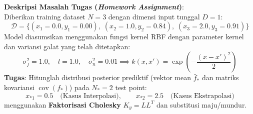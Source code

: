 \documentclass[11pt,a4paper]{article}
\def\mathbf#1{#1}%
\begin{document}
\begin{mdframed}[linewidth=1pt, linecolor=black!60, backgroundcolor=yellow!3]
\textbf{Deskripsi Masalah Tugas (\textit{Homework Assignment})}:\\
Diberikan training dataset $N = 3$ dengan dimensi input tunggal $D = 1$:
\begin{equation*}
\mathcal{D} = \big\{ (x_1 = 0.0, y_1 = 0.00), \; (x_2 = 1.0, y_2 = 0.84), \; (x_3 = 2.0, y_3 = 0.91) \big\}
\end{equation*}
Model diasumsikan menggunakan fungsi kernel RBF dengan parameter kernel dan variansi galat yang telah ditetapkan:
\begin{equation*}
\sigma_f^2 = 1.0, \quad l = 1.0, \quad \sigma_n^2 = 0.01 \implies k(x, x') = \exp\left( -\frac{(x - x')^2}{2} \right)
\end{equation*}
\textbf{Tugas}:
Hitunglah distribusi posterior prediktif (vektor mean $\bar{\mathbf{f}}_*$ dan matriks kovariansi $\operatorname{cov}(\mathbf{f}_*)$) pada $N_* = 2$ test point:
\begin{equation*}
x_{*1} = 0.5 \quad \text{(Kasus Interpolasi)}, \qquad x_{*2} = 2.5 \quad \text{(Kasus Ekstrapolasi)}
\end{equation*}
menggunakan \textbf{Faktorisasi Cholesky} $K_y = L L^T$ dan substitusi maju/mundur.
\end{mdframed}
\end{document}
